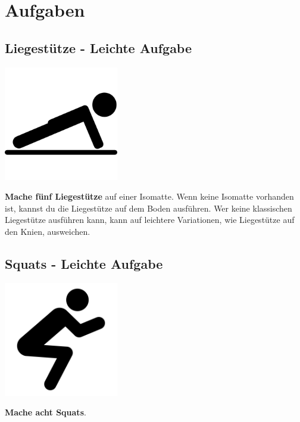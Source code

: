 \section{Aufgaben}
\newpage
\subsection{Liegestütze - Leichte Aufgabe}
\vfill
\begin{center}
    \includegraphics[height=5cm]{graphics/push_up.png}
\end{center}
\vfill
\textbf{Mache fünf Liegestütze} auf einer Isomatte.
Wenn keine Isomatte vorhanden ist, kannst du die Liegestütze auf dem Boden
ausführen.
Wer keine klassischen Liegestütze ausführen kann, kann auf leichtere
Variationen, wie Liegestütze auf den Knien, ausweichen.
\newpage

\subsection{Squats - Leichte Aufgabe}
\vfill
\begin{center}
    \includegraphics[height=5cm]{graphics/squat.png}
    \end{center}
\vfill
\textbf{Mache acht Squats}.
\newline
\newpage

